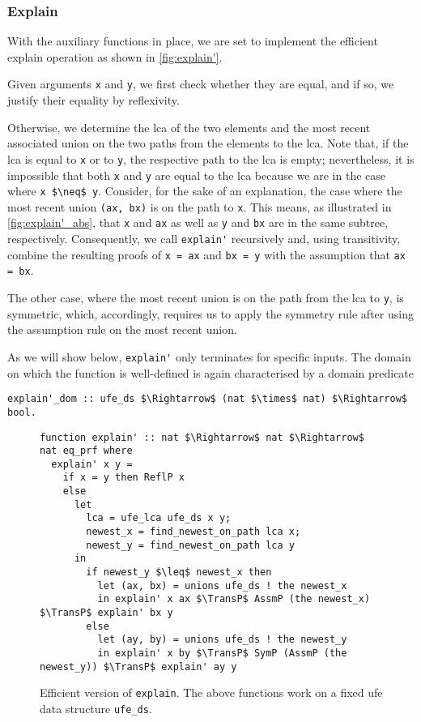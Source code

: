 \documentclass[
  sigplan,
  10pt,
  anonymous,
  review,
  ]{acmart}
\newcommand{\TransP}{\bigtriangledown}
\begin{document}
\subsubsection{Explain}
With the auxiliary functions in place, we are set to implement the efficient explain operation as shown in \autoref{fig:explain'}.

Given arguments \lstinline|x| and \lstinline|y|, we first check whether they are equal, and if so, we justify their equality by reflexivity.

Otherwise, we determine the \acrshort{lca} of the two elements and the most recent associated union on the two paths from the elements to the \acrshort{lca}.
Note that, if the \acrshort{lca} is equal to \lstinline|x| or to \lstinline|y|, the respective path to the \acrshort{lca} is empty;
nevertheless, it is impossible that both \lstinline|x| and \lstinline|y| are equal to the \acrshort{lca} because we are in the case where \lstinline|x $\neq$ y|.
Consider, for the sake of an explanation, the case where the most recent union \lstinline|(ax, bx)| is on the path to \lstinline|x|.
This means, as illustrated in \autoref{fig:explain'_abs}, that \lstinline|x| and \lstinline|ax| as well as \lstinline|y| and \lstinline|bx| are in the same subtree, respectively.
Consequently, we call \lstinline|explain'| recursively and, using transitivity, combine the resulting proofs of \lstinline|x = ax| and \lstinline|bx = y| with the assumption that \lstinline|ax = bx|.

The other case, where the most recent union is on the path from the \acrshort{lca} to \lstinline|y|, is symmetric, which, accordingly, requires us to apply the symmetry rule after using the assumption rule on the most recent union.

As we will show below, \lstinline|explain'| only terminates for specific inputs.
The domain on which the function is well-defined is again characterised by a domain predicate
\begin{lstlisting}
explain'_dom :: ufe_ds $\Rightarrow$ (nat $\times$ nat) $\Rightarrow$ bool.
\end{lstlisting}
\begin{figure*}
  \centering
  \begin{lstlisting}
function explain' :: nat $\Rightarrow$ nat $\Rightarrow$ nat eq_prf where
  explain' x y =
    if x = y then ReflP x
    else
      let
        lca = ufe_lca ufe_ds x y;
        newest_x = find_newest_on_path lca x;
        newest_y = find_newest_on_path lca y
      in
        if newest_y $\leq$ newest_x then
          let (ax, bx) = unions ufe_ds ! the newest_x
          in explain' x ax $\TransP$ AssmP (the newest_x) $\TransP$ explain' bx y
        else
          let (ay, by) = unions ufe_ds ! the newest_y
          in explain' x by $\TransP$ SymP (AssmP (the newest_y)) $\TransP$ explain' ay y
  \end{lstlisting}
  \caption{Efficient version of \lstinline|explain|. The above functions work on a fixed \acrshort{ufe} data structure \lstinline|ufe_ds|.\label{fig:explain'}}
\end{figure*}
\end{document}
